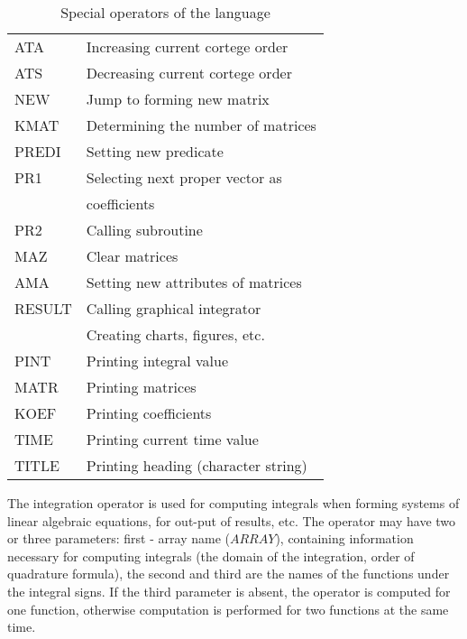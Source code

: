 {\begin{table}
\begin{center}
\begin{tabular}{|l|l|}
     ATA       &    Increasing current cortege order          \\
     ATS       &    Decreasing current cortege order          \\
     NEW       &    Jump to forming new matrix                \\
     KMAT      &    Determining the number of matrices        \\
     PREDI     &    Setting new predicate                     \\
     PR1       &    Selecting next proper vector as           \\
               &    coefficients                              \\
     PR2       &    Calling subroutine                        \\
     MAZ       &    Clear matrices                            \\
     AMA       &    Setting new attributes of matrices        \\ \hline
     RESULT    &    Calling graphical integrator              \\
               &    Creating charts, figures, etc.            \\ \hline
     PINT      &    Printing integral value                   \\
     MATR      &    Printing matrices                         \\
     KOEF      &    Printing coefficients                     \\
     TIME      &    Printing current time value               \\
     TITLE     &    Printing heading (character string)       \\ \hline
  \end{tabular}
  \end{center}
  \caption{Special operators of the language\label{t3}}
\end{table}}

The integration operator is used for computing integrals when forming
systems of linear algebraic equations, for out-put of results, etc. The
operator may have two or three parameters: first - array name ($ARRAY$),
containing information necessary for computing integrals (the domain of the
integration, order of quadrature formula), the second and third are the
names of the functions under the integral signs. If the third parameter is
absent, the operator is computed for one function, otherwise computation is
performed for two functions at the same time.

